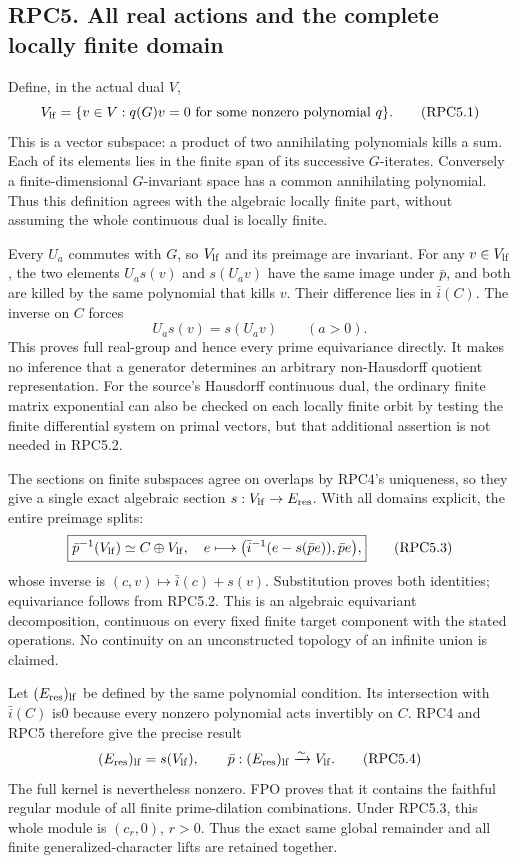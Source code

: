 \subsection{RPC5. All real actions and the complete locally finite
domain}\label{rpc5.-all-real-actions-and-the-complete-locally-finite-domain}

Define, in the actual dual \(V\), \[
V_{\rm lf}=\{v\in V:q(G)v=0\text{ for some nonzero polynomial }q\}.
\tag{RPC5.1}
\] This is a vector subspace: a product of two annihilating polynomials
kills a sum. Each of its elements lies in the finite span of its
successive \(G\)-iterates. Conversely a finite-dimensional
\(G\)-invariant space has a common annihilating polynomial. Thus this
definition agrees with the algebraic locally finite part, without
assuming the whole continuous dual is locally finite.

Every \(U_a\) commutes with \(G\), so \(V_{\rm lf}\) and its preimage
are invariant. For any \(v\in V_{\rm lf}\), the two elements \(U_as(v)\)
and \(s(U_av)\) have the same image under \(\bar p\), and both are
killed by the same polynomial that kills \(v\). Their difference lies in
\(\bar i(C)\). The inverse on \(C\) forces \[
\boxed{U_as(v)=s(U_av)\qquad(a>0).}
\tag{RPC5.2}
\] This proves full real-group and hence every prime equivariance
directly. It makes no inference that a generator determines an arbitrary
non-Hausdorff quotient representation. For the source's Hausdorff
continuous dual, the ordinary finite matrix exponential can also be
checked on each locally finite orbit by testing the finite differential
system on primal vectors, but that additional assertion is not needed in
RPC5.2.

The sections on finite subspaces agree on overlaps by RPC4's uniqueness,
so they give a single exact algebraic section
\(s:V_{\rm lf}\to E_{\rm res}\). With all domains explicit, the entire
preimage splits: \[
\boxed{
\bar p^{-1}(V_{\rm lf})\simeq C\oplus V_{\rm lf},
\quad e\longmapsto\bigl(\bar i^{-1}(e-s(\bar p e)),\bar p e\bigr),
}
\tag{RPC5.3}
\] whose inverse is \((c,v)\mapsto\bar i(c)+s(v)\). Substitution proves
both identities; equivariance follows from RPC5.2. This is an algebraic
equivariant decomposition, continuous on every fixed finite target
component with the stated operations. No continuity on an unconstructed
topology of an infinite union is claimed.

Let \((E_{\rm res})_{\rm lf}\) be defined by the same polynomial
condition. Its intersection with \(\bar i(C)\) is0 because every nonzero
polynomial acts invertibly on \(C\). RPC4 and RPC5 therefore give the
precise result \[
(E_{\rm res})_{\rm lf}=s(V_{\rm lf}),\qquad
\bar p:(E_{\rm res})_{\rm lf}\xrightarrow{\sim}V_{\rm lf}.
\tag{RPC5.4}
\] The full kernel is nevertheless nonzero. FPO proves that it contains
the faithful regular module of all finite prime-dilation combinations.
Under RPC5.3, this whole module is \((c_r,0)\), \(r>0\). Thus the exact
same global remainder and all finite generalized-character lifts are
retained together.

